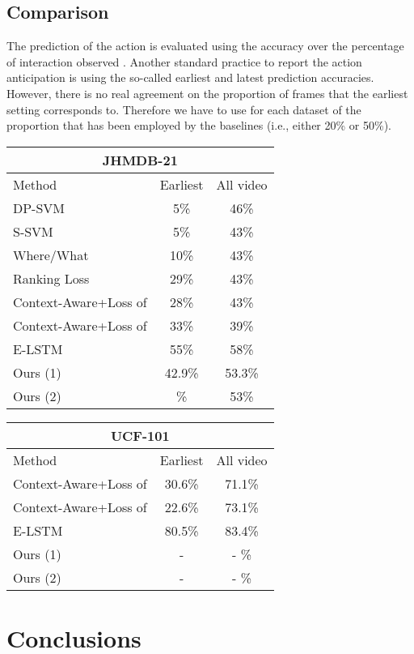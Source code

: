 \documentclass[10pt,twocolumn,letterpaper]{article}
\begin{document}
\subsection{Comparison}

The prediction of the action is evaluated using the accuracy over the percentage of interaction observed \cite{soomro2016online, aliakbarian2017encouraging}. Another standard practice to report the action anticipation is using the so-called earliest and latest prediction accuracies. However, there is no real agreement on the proportion of frames that the earliest setting corresponds to. Therefore we have to use for each dataset of the proportion that has been employed by the baselines (i.e., either 20\% or 50\%).

\begin{table}[ht!]
    \centering
  \begin{tabular}{lcc}
    \multicolumn{3}{c}{\textbf{JHMDB-21}}\\ \hline
    Method & Earliest & All video \\ \hline
    DP-SVM & 5\% & 46\% \\
S-SVM & 5\% & 43\% \\
Where/What & 10\% & 43\% \\
Ranking Loss & 29\% & 43\% \\
Context-Aware+Loss of & 28\% & 43\% \\
Context-Aware+Loss of & 33\% & 39\% \\
E-LSTM \cite{aliakbarian2017encouraging} & 55\% & 58\% \\ \hline
    Ours (1) & 42.9\% & 53.3\% \\ 
    Ours (2) & \% & 53\% \\ \hline
  \end{tabular}
\end{table}

\begin{table}[ht!]
    \centering
  \begin{tabular}{lcc}
    \multicolumn{3}{c}{\textbf{UCF-101}}\\ \hline
    Method & Earliest & All video \\ \hline
    Context-Aware+Loss of & 30.6\% & 71.1\% \\
    Context-Aware+Loss of & 22.6\% & 73.1\% \\
    E-LSTM \cite{aliakbarian2017encouraging} & 80.5\% & 83.4\% \\ \hline
    Ours (1) & - & - \% \\ 
    Ours (2) & - & - \% \\ \hline
  \end{tabular}
\end{table}

\section{Conclusions}
\endgroup

{\small


}
\end{document}
